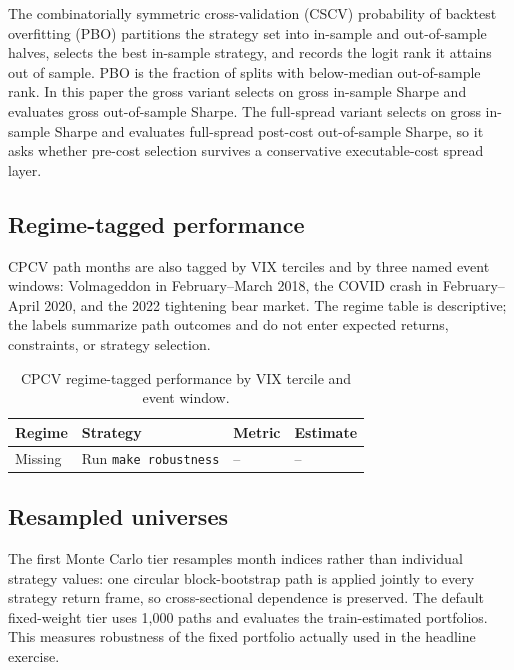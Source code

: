 The combinatorially symmetric cross-validation (CSCV) probability of backtest overfitting
(PBO) partitions the strategy set into
in-sample and out-of-sample halves, selects the best in-sample strategy, and records the
logit rank it attains out of sample. PBO is the fraction of splits with below-median
out-of-sample rank. In this paper the gross variant selects on gross in-sample Sharpe and
evaluates gross out-of-sample Sharpe. The full-spread variant selects on gross in-sample
Sharpe and evaluates full-spread post-cost out-of-sample Sharpe, so it asks whether
pre-cost selection survives a conservative executable-cost spread layer.

\subsection{Regime-tagged performance}

CPCV path months are also tagged by VIX terciles and by three named event windows:
Volmageddon in February--March 2018, the COVID crash in February--April 2020, and the
2022 tightening bear market. The regime table is descriptive; the labels summarize path
outcomes and do not enter expected returns, constraints, or strategy selection.

\begin{table}[H]
\centering
\scriptsize
{}
  {\resizebox{\textwidth}{!}{}}
  {\begin{tabular}{llll}\toprule Regime & Strategy & Metric & Estimate \\\midrule Missing & Run \texttt{make robustness} & -- & -- \\\bottomrule\end{tabular}}
\caption{CPCV regime-tagged performance by VIX tercile and event window.}
\label{tab:cv_regime_performance}
\end{table}

\clearpage

\subsection{Resampled universes}

The first Monte Carlo tier resamples month indices rather than individual strategy values:
one circular block-bootstrap path is applied jointly to every strategy return frame, so
cross-sectional dependence is preserved. The default fixed-weight tier uses 1,000 paths
and evaluates the train-estimated portfolios. This measures robustness of the fixed
portfolio actually used in the headline exercise.

